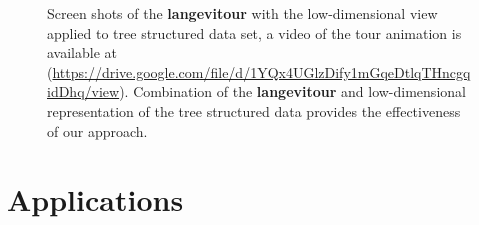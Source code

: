 \documentclass[
  12pt]{article}
\begin{document}
\begin{figure}
\begin{minipage}[t]{0.33\linewidth}
{{}

}

\end{minipage}%
%
\begin{minipage}[t]{0.33\linewidth}

{\centering 


}

\end{minipage}%

\caption{\label{fig-exp2_sc}Screen shots of the \textbf{langevitour}
with the low-dimensional view applied to tree structured data set, a
video of the tour animation is available at
(\url{https://drive.google.com/file/d/1YQx4UGlzDify1mGqeDtlqTHncgqidDhq/view}).
Combination of the \textbf{langevitour} and low-dimensional
representation of the tree structured data provides the effectiveness of
our approach.}

\end{figure}

\hypertarget{sec-applications}{%
\section{Applications}\label{sec-applications}}
\end{document}
